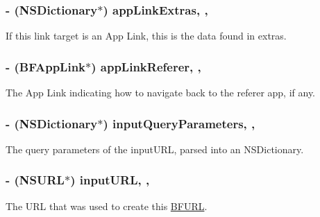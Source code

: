 \subsubsection[{app\+Link\+Extras}]{\setlength{\rightskip}{0pt plus 5cm}-\/ (N\+S\+Dictionary$\ast$) app\+Link\+Extras\hspace{0.3cm}{\ttfamily [read]}, {\ttfamily [nonatomic]}, {\ttfamily [strong]}}\label{interface_b_f_u_r_l_a47ef1fbe340b610c07b6f80e0c3c16ab}
If this link target is an App Link, this is the data found in extras. \hypertarget{interface_b_f_u_r_l_a0256b0b7763ce81aa3556c13d2363f57}{}
\subsubsection[{app\+Link\+Referer}]{\setlength{\rightskip}{0pt plus 5cm}-\/ ({\bf B\+F\+App\+Link}$\ast$) app\+Link\+Referer\hspace{0.3cm}{\ttfamily [read]}, {\ttfamily [nonatomic]}, {\ttfamily [strong]}}\label{interface_b_f_u_r_l_a0256b0b7763ce81aa3556c13d2363f57}
The App Link indicating how to navigate back to the referer app, if any. \hypertarget{interface_b_f_u_r_l_a03a744a57286fa44530dcfc5528fa49d}{}
\subsubsection[{input\+Query\+Parameters}]{\setlength{\rightskip}{0pt plus 5cm}-\/ (N\+S\+Dictionary$\ast$) input\+Query\+Parameters\hspace{0.3cm}{\ttfamily [read]}, {\ttfamily [nonatomic]}, {\ttfamily [strong]}}\label{interface_b_f_u_r_l_a03a744a57286fa44530dcfc5528fa49d}
The query parameters of the input\+U\+R\+L, parsed into an N\+S\+Dictionary. \hypertarget{interface_b_f_u_r_l_a588a05e6eaedf5f9b17ce0f85edbef20}{}
\subsubsection[{input\+U\+R\+L}]{\setlength{\rightskip}{0pt plus 5cm}-\/ (N\+S\+U\+R\+L$\ast$) input\+U\+R\+L\hspace{0.3cm}{\ttfamily [read]}, {\ttfamily [nonatomic]}, {\ttfamily [strong]}}\label{interface_b_f_u_r_l_a588a05e6eaedf5f9b17ce0f85edbef20}
The U\+R\+L that was used to create this \hyperlink{interface_b_f_u_r_l}{B\+F\+U\+R\+L}. \hypertarget{interface_b_f_u_r_l_a874bc9b6e197567616676e7c35882312}{}
